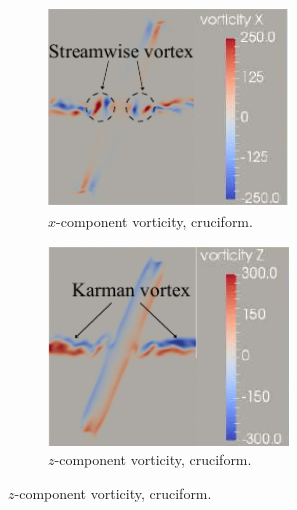 \documentclass[a4paper,fleqn]{cas-sc}
\begin{document}
\begin{figure}
  \centering
  \begin{subfigure}[h]{0.4\textwidth}
    \centering
    \includegraphics[width=0.7\textwidth]{figs/vorx675}
    \caption{$x$-component vorticity, \angfo{} cruciform.}
    \label{fig:vorx675}
  \end{subfigure}
  \begin{subfigure}[h]{0.4\textwidth}
    \centering
    \includegraphics[width=0.7\textwidth]{figs/vorz675}
    \caption{$z$-component vorticity, \angfo{} cruciform.}
    \label{fig:vorz675}
  \end{subfigure}


\end{figure}
\end{document}
